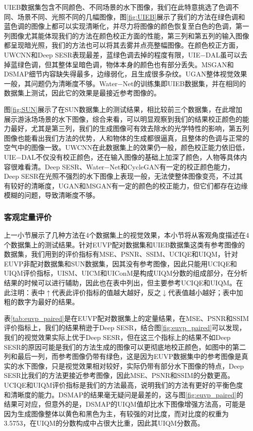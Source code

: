 UIEB数据集包含不同颜色、不同场景的水下图像，我们在此特意挑选了色调不同、场景不同、光照不同的几幅图像，图\ref{fig:UIEB}展示了我们的方法在绿色调和蓝色调的图像上都可以实现清晰化，并尽力将图像的颜色恢复至白色的色调，第一列图像尤其能体现我们的方法在颜色校正方面的性能，第三列和第五列的输入图像都呈现暗光照，我们的方法也可以将其去雾并点亮整幅图像。在颜色校正方面，UWCNN和Deep SESR表现最差，蓝绿色调去掉的程度有限，UIE$-$DAL虽可以去掉蓝绿色调，但其整体呈暗色调，物体本身的颜色也有部分丢失。MSGAN和DSMAP细节内容缺失得最多，边缘弱化，且生成很多杂纹。UGAN整体视觉效果一般，其问题仍为清晰度不够。Water$-$Net的训练集即UIEB数据集，并在相同的数据集上测试，因此它的效果是最接近参考图像的。

图\ref{fig:SUN}展示了在SUN数据集上的测试结果，相比较前三个数据集，在此增加展示游泳场场景的水下图像，综合来看，可以明显观察到我们的结果校正颜色的能力最好，尤其是第三列，我们的生成图像可有效去除水的光学特性的影响，第五列图像也能看出我们方法的优势，人和物体的生成都很逼真，且整体的色调与正常的空气中的图像一致。UWCNN在此数据集上的效果仍一般，颜色校正能力依旧低，UIE$-$DAL不仅没有校正颜色，还在输入图像的基础上加深了颜色，人物等具体内容很难看清。Deep SESR、Water$-$Net和CycleGAN有一定的校正颜色能力，Deep SESR在光照不强烈的水下图像上表现一般，无法使整体图像变亮，不过其有较好的清晰度，UGAN和MSGAN有一定的颜色的校正能力，但它们都存在边缘模糊的问题，导致清晰度不够。 

\subsubsection{客观定量评价}

上一小节展示了几种方法在4个数据集上的视觉效果，本小节将从客观角度描述在4个数据集上的测试结果。针对EUVP配对数据集和UIEB数据集这类有参考图像的数据集，我们用到的评价指标有MSE、PSNR、SSIM、UCIQE和UIQM，针对EUVP非配对数据集和SUN数据集，因其没有参考图像，因此只能用UCIQE和UIQM评价指标，UISM、UICM和UIConM是构成UIQM分数的组成部分，在分析结果的时候可以进行辅助，因此也在表中列出，但主要参考UCIQE和UIQM。在此注明：表中$\uparrow$代表此评价指标的值越大越好，反之$\downarrow$代表值越小越好；表中加粗的数字为最好的结果。

表\ref{tab:euvp_paired}是在EUVP配对数据集上的定量结果，在MSE、PSNR和SSIM评价指标上，我们的结果稍逊于Deep SESR，结合图\ref{fig:euvp_paired}可以发现，我们的视觉效果实际上优于Deep SESR，但在这三个指标上的结果不如Deep SESR的原因可能是我们的方法生成的图像可以更彻底地校正颜色，如图中的第二列和最后一列，而参考图像仍带有绿色，这是因为EUVP数据集中的参考图像是真实的水下图像，只是视觉效果相对较好，实际仍带有部分水下图像的特点，Deep SESR比我们的方法更接近参考图像，因此MSE、PSNR和SSIM的分数更高。UCIQE和UIQM评价指标是我们的方法最高，说明我们的方法有更好的平衡色度和清晰度的能力。DSMAP的结果毫无疑问是最差的，这与图\ref{fig:euvp_paired}的结果可对应，但意外的是，DSMAP的UIQM值却比水下图像增强方法高，可能是因为生成图像整体以黄色和黑色为主，有较强的对比度，而对比度的权重为3.5753，在UIQM的分数构成中占很大比重，因此其UIQM分数高。

